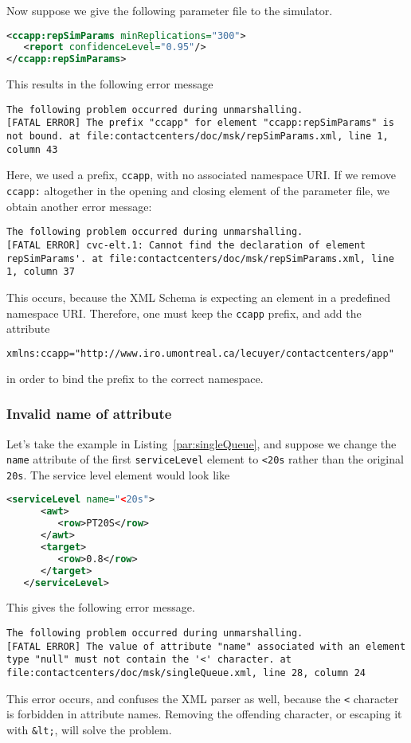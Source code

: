 Now suppose we give the following parameter file to the simulator.
\begin{lstlisting}[language=XML]
<ccapp:repSimParams minReplications="300">
   <report confidenceLevel="0.95"/>
</ccapp:repSimParams>
\end{lstlisting}
This results in the following error message
\begin{lstlisting}[language={},breaklines,prebreak={\char92}]
The following problem occurred during unmarshalling.
[FATAL ERROR] The prefix "ccapp" for element "ccapp:repSimParams" is not bound. at file:contactcenters/doc/msk/repSimParams.xml, line 1, column 43
\end{lstlisting}
Here, we used a prefix, \texttt{ccapp}, with no associated namespace
URI.
If we remove \texttt{ccapp:} altogether in the opening and closing
element of the parameter file, we obtain another error message:
\begin{lstlisting}[language={},breaklines,prebreak={\char92}]
The following problem occurred during unmarshalling.
[FATAL ERROR] cvc-elt.1: Cannot find the declaration of element repSimParams'. at file:contactcenters/doc/msk/repSimParams.xml, line 1, column 37
\end{lstlisting}
This occurs, because the XML Schema is expecting an element in a
predefined
namespace URI.
Therefore, one must keep the \texttt{ccapp} prefix, and
add the attribute
\begin{lstlisting}[language=XML]
xmlns:ccapp="http://www.iro.umontreal.ca/lecuyer/contactcenters/app"
\end{lstlisting}
in order to bind the prefix to the correct namespace.

\subsubsection{Invalid name of attribute}

Let's take the example in Listing~\ref{par:singleQueue}, and
suppose we change the \texttt{name} attribute of the first
\texttt{service\-Level} element to \texttt{<20s} rather than the
original \texttt{20s}. The service level element would look like
\begin{lstlisting}[language=XML]
   <serviceLevel name="<20s">
      <awt>
         <row>PT20S</row>
      </awt>
      <target>
         <row>0.8</row>
      </target>
   </serviceLevel>
\end{lstlisting}
This gives the following error message.
\begin{lstlisting}[language={},breaklines,prebreak={\char92}]
The following problem occurred during unmarshalling.
[FATAL ERROR] The value of attribute "name" associated with an element type "null" must not contain the '<' character. at file:contactcenters/doc/msk/singleQueue.xml, line 28, column 24
\end{lstlisting}
This error occurs, and confuses the XML parser as well, because the
\texttt{<} character is forbidden in attribute names.
Removing the offending character, or escaping it with
\texttt{\&lt;}, will solve the problem.


